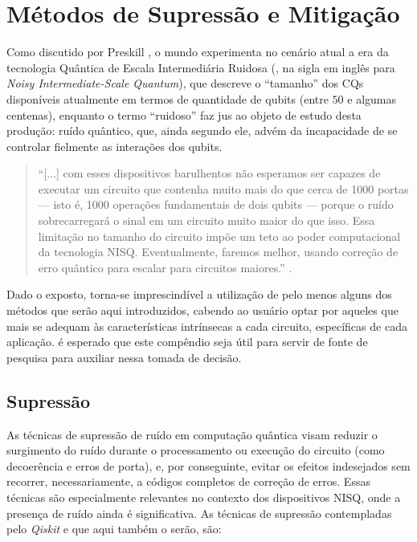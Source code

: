 \section{M\'{e}todos de Supress\~{a}o e Mitigaç\~{a}o}
\label{sec: supressaoMitigacao}

Como discutido por Preskill \citeyear{Preskill2018_NISQ}, o mundo experimenta no cen\'{a}rio atual a era da tecnologia Qu\^{a}ntica de Escala Intermedi\'{a}ria Ruidosa (, na sigla em ingl\^{e}s para \textit{Noisy Intermediate-Scale Quantum}), que descreve o “tamanho” dos CQs dispon\'{i}veis atualmente em termos de quantidade de qubits (entre $50$ e algumas centenas), enquanto o termo “ruidoso” faz jus ao objeto de estudo desta produç\~{a}o: ru\'{i}do qu\^{a}ntico, que, ainda segundo ele, adv\'{e}m da incapacidade de se controlar fielmente as interaç\~{o}es dos qubits. 

\begin{quote}
    “[...] com esses dispositivos barulhentos n\~{a}o esperamos ser capazes de executar um circuito que contenha muito mais do que cerca de 1000 portas — isto \'{e}, 1000 operaç\~{o}es fundamentais de dois qubits — porque o ru\'{i}do sobrecarregar\'{a} o sinal em um circuito muito maior do que isso. Essa limitaç\~{a}o no tamanho do circuito imp\~{o}e um teto ao poder computacional da tecnologia NISQ. Eventualmente, faremos melhor, usando correç\~{a}o de erro qu\^{a}ntico para escalar para circuitos maiores.” \cite{Preskill2018_NISQ}.
\end{quote}

Dado o exposto, torna-se imprescind\'{i}vel a utilizaç\~{a}o de pelo menos alguns dos m\'{e}todos que ser\~{a}o aqui introduzidos, cabendo ao usu\'{a}rio optar por aqueles que mais se adequam às caracter\'{i}sticas intr\'{i}nsecas a cada circuito, espec\'{i}ficas de cada aplicaç\~{a}o. \'{e} esperado que este comp\^{e}ndio seja \'{u}til para servir de fonte de pesquisa para auxiliar nessa tomada de decis\~{a}o.

\subsection{Supress\~{a}o}
\label{subSec: supressao}


As t\'{e}cnicas de supress\~{a}o de ru\'{i}do em computaç\~{a}o qu\^{a}ntica visam reduzir o surgimento do ru\'{i}do durante o processamento ou execuç\~{a}o do circuito (como decoer\^{e}ncia e erros de porta), e, por conseguinte, evitar os efeitos indesejados sem recorrer, necessariamente, a códigos completos de correç\~{a}o de erros. Essas t\'{e}cnicas s\~{a}o especialmente relevantes no contexto dos dispositivos NISQ, onde a presença de ru\'{i}do ainda \'{e} significativa. As t\'{e}cnicas de supress\~{a}o contempladas pelo \emph{Qiskit} e que aqui tamb\'{e}m o ser\~{a}o, s\~{a}o:

